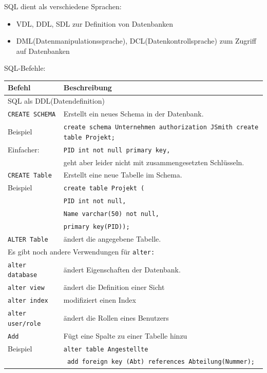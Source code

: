 \documentclass{article}
\begin{document}
SQL dient als verschiedene Sprachen:
\begin{itemize}
  \item VDL, DDL, SDL zur Definition von Datenbanken
  \item DML(Datenmanipulationssprache), DCL(Datenkontrollsprache) zum Zugriff auf Datenbanken
\end{itemize}
SQL-Befehle:
\begin{center}
  \begin{longtable}{|p{4cm}|p{7cm}|}
    \hline
    \textbf{Befehl} & \textbf{Beschreibung} \\
    \hline
    \multicolumn{2}{|p{11cm}|}{SQL als DDL(Datendefinition)} \\
    \hline
    \texttt{CREATE SCHEMA} & Erstellt ein neues Schema in der Datenbank. \\
    \hline    
    Beispiel & \texttt{create schema Unternehmen authorization JSmith create table Projekt;} \\
    \hline
    Einfacher: & \texttt{PID int not null primary key,} \\
    & geht aber leider nicht mit zusammengesetzten Schlüsseln. \\
    \hline
    \texttt{CREATE Table} & Erstellt eine neue Tabelle im Schema. \\
    \hline
    Beispiel & \texttt{create table Projekt (} \\ & \texttt{PID int not null,} \\ & \texttt{Name varchar(50) not null, } \\ & \texttt{primary key(PID));} \\
    \hline
    \texttt{ALTER Table} & ändert die angegebene Tabelle. \\
    \hline
    \multicolumn{2}{|p{11cm}|}{Es gibt noch andere Verwendungen für \texttt{alter:}} \\
    \texttt{alter database} & ändert Eigenschaften der Datenbank. \\
    \texttt{alter view} & ändert die Definition einer Sicht \\
    \texttt{alter index} & modifiziert einen Index \\
    \texttt{alter user/role} & ändert die Rollen eines Benutzers \\
    \hline
    \texttt{Add} & Fügt eine Spalte zu einer Tabelle hinzu \\
    \hline
    Beispiel & \texttt{alter table Angestellte} \\
    & \texttt{ add foreign key (Abt) references Abteilung(Nummer);} \\

\end{longtable}
\end{center}
\end{document}
